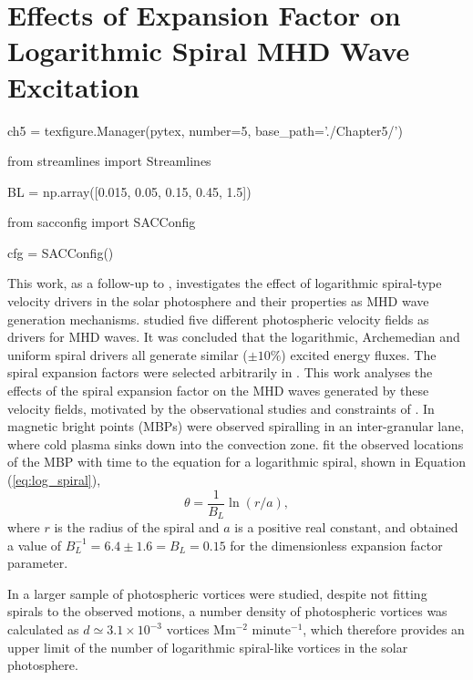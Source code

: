 
\chapter{Effects of Expansion Factor on Logarithmic Spiral MHD Wave Excitation}

\begin{pycode}[chapter5]
ch5 = texfigure.Manager(pytex, number=5, base_path='./Chapter5/')

from streamlines import Streamlines

BL = np.array([0.015, 0.05, 0.15, 0.45, 1.5])

from sacconfig import SACConfig

cfg = SACConfig()
\end{pycode}

This work, as a follow-up to \cite{Mumford2015}, investigates the effect of logarithmic spiral-type velocity drivers in the solar photosphere and their properties as MHD wave generation mechanisms.
\cite{Mumford2015} studied five different photospheric velocity fields as drivers for MHD waves.
It was concluded that the logarithmic, Archemedian and uniform spiral drivers all generate similar ($\pm 10\%$) excited energy fluxes.
The spiral expansion factors were selected arbitrarily in \cite{Mumford2015}.
This work analyses the effects of the spiral expansion factor on the MHD waves generated by these velocity fields, motivated by the observational studies and constraints of \cite{Bonet2008}.
In \cite{Bonet2008} magnetic bright points (MBPs) were observed spiralling in an inter-granular lane, where cold plasma sinks down into the convection zone.
\cite{Bonet2008} fit the observed locations of the MBP with time to the equation for a logarithmic spiral, shown in Equation (\ref{eq:log_spiral}),
\begin{equation}
\theta = \frac{1}{B_L}\ln(r/a),
\label{eq:log_spiral}
\end{equation}
where $r$ is the radius of the spiral and $a$ is a positive real constant, and obtained a value of $B_L^{-1} = 6.4 \pm 1.6 = B_L = 0.15$ for the dimensionless expansion factor parameter.

In \cite{Bonet2010} a larger sample of photospheric vortices were studied, despite not fitting spirals to the observed motions, a number density of photospheric vortices was calculated as $d \simeq 3.1 \times 10^{-3}$ vortices Mm$^{-2}$ minute$^{-1}$, which therefore provides an upper limit of the number of logarithmic spiral-like vortices in the solar photosphere.

